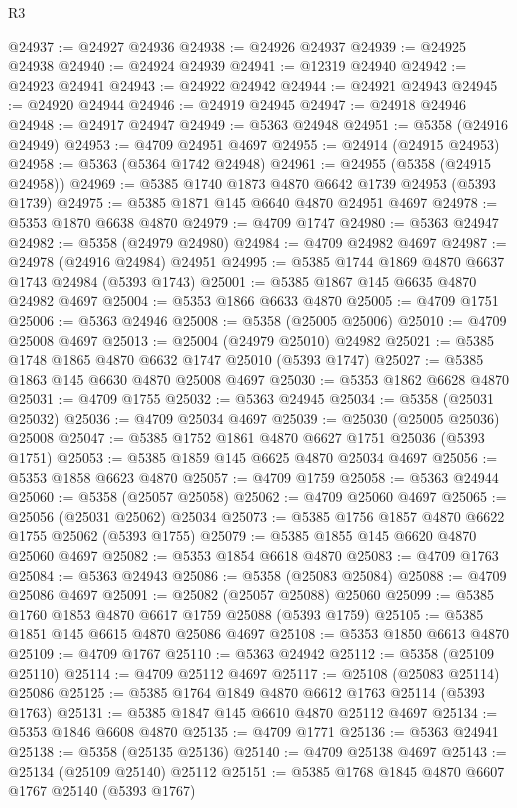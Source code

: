 \begin{lexlean}{R3}
\begin{coremodule}
@24937 := @24927 @24936
@24938 := @24926 @24937
@24939 := @24925 @24938
@24940 := @24924 @24939
@24941 := @12319 @24940
@24942 := @24923 @24941
@24943 := @24922 @24942
@24944 := @24921 @24943
@24945 := @24920 @24944
@24946 := @24919 @24945
@24947 := @24918 @24946
@24948 := @24917 @24947
@24949 := @5363 @24948
@24951 := @5358 (@24916 @24949)
@24953 := @4709 @24951 @4697
@24955 := @24914 (@24915 @24953)
@24958 := @5363 (@5364 @1742 @24948)
@24961 := @24955 (@5358 (@24915 @24958))
@24969 := @5385 @1740 @1873 @4870 @6642 @1739 @24953 (@5393 @1739)
@24975 := @5385 @1871 @145 @6640 @4870 @24951 @4697
@24978 := @5353 @1870 @6638 @4870
@24979 := @4709 @1747
@24980 := @5363 @24947
@24982 := @5358 (@24979 @24980)
@24984 := @4709 @24982 @4697
@24987 := @24978 (@24916 @24984) @24951
@24995 := @5385 @1744 @1869 @4870 @6637 @1743 @24984 (@5393 @1743)
@25001 := @5385 @1867 @145 @6635 @4870 @24982 @4697
@25004 := @5353 @1866 @6633 @4870
@25005 := @4709 @1751
@25006 := @5363 @24946
@25008 := @5358 (@25005 @25006)
@25010 := @4709 @25008 @4697
@25013 := @25004 (@24979 @25010) @24982
@25021 := @5385 @1748 @1865 @4870 @6632 @1747 @25010 (@5393 @1747)
@25027 := @5385 @1863 @145 @6630 @4870 @25008 @4697
@25030 := @5353 @1862 @6628 @4870
@25031 := @4709 @1755
@25032 := @5363 @24945
@25034 := @5358 (@25031 @25032)
@25036 := @4709 @25034 @4697
@25039 := @25030 (@25005 @25036) @25008
@25047 := @5385 @1752 @1861 @4870 @6627 @1751 @25036 (@5393 @1751)
@25053 := @5385 @1859 @145 @6625 @4870 @25034 @4697
@25056 := @5353 @1858 @6623 @4870
@25057 := @4709 @1759
@25058 := @5363 @24944
@25060 := @5358 (@25057 @25058)
@25062 := @4709 @25060 @4697
@25065 := @25056 (@25031 @25062) @25034
@25073 := @5385 @1756 @1857 @4870 @6622 @1755 @25062 (@5393 @1755)
@25079 := @5385 @1855 @145 @6620 @4870 @25060 @4697
@25082 := @5353 @1854 @6618 @4870
@25083 := @4709 @1763
@25084 := @5363 @24943
@25086 := @5358 (@25083 @25084)
@25088 := @4709 @25086 @4697
@25091 := @25082 (@25057 @25088) @25060
@25099 := @5385 @1760 @1853 @4870 @6617 @1759 @25088 (@5393 @1759)
@25105 := @5385 @1851 @145 @6615 @4870 @25086 @4697
@25108 := @5353 @1850 @6613 @4870
@25109 := @4709 @1767
@25110 := @5363 @24942
@25112 := @5358 (@25109 @25110)
@25114 := @4709 @25112 @4697
@25117 := @25108 (@25083 @25114) @25086
@25125 := @5385 @1764 @1849 @4870 @6612 @1763 @25114 (@5393 @1763)
@25131 := @5385 @1847 @145 @6610 @4870 @25112 @4697
@25134 := @5353 @1846 @6608 @4870
@25135 := @4709 @1771
@25136 := @5363 @24941
@25138 := @5358 (@25135 @25136)
@25140 := @4709 @25138 @4697
@25143 := @25134 (@25109 @25140) @25112
@25151 := @5385 @1768 @1845 @4870 @6607 @1767 @25140 (@5393 @1767)

\end{coremodule}
\end{lexlean}
